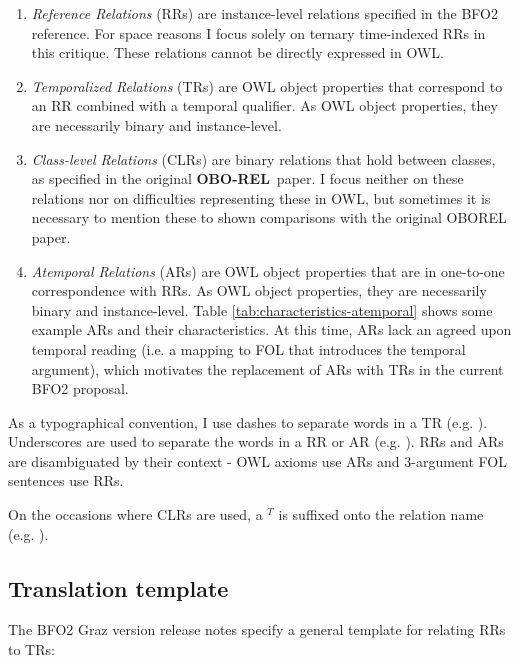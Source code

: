 \documentclass{bioinfo}
\def\partOfT{\pr{part\_of$^T$}}
\def\partOf{\pr{part\_of}}
\def\partOfAtAllTimes{\pr{part-of-at-all-times}}
\def\OBOREL{\textbf{OBO-REL}}
\begin{document}
\begin{enumerate}

\item \emph{Reference Relations} (RRs) are instance-level relations
  specified in the BFO2 reference. For space reasons I focus solely on
  ternary time-indexed RRs in this critique. These relations cannot be
  directly expressed in OWL.

\item \emph{Temporalized Relations} (TRs) are OWL object properties
  that correspond to an RR combined with a temporal qualifier. As OWL
  object properties, they are necessarily binary and instance-level.

\item \emph{Class-level Relations} (CLRs) are binary relations that
  hold between classes, as specified in the original \OBOREL\ paper. I
  focus neither on these relations nor on difficulties representing
  these in OWL, but sometimes it is necessary to mention these to
  shown comparisons with the original OBOREL paper.

\item \emph{Atemporal Relations} (ARs) are OWL object properties that
  are in one-to-one correspondence with RRs. As OWL object properties,
  they are necessarily binary and instance-level. Table
  \ref{tab:characteristics-atemporal} shows some example ARs and their
  characteristics. At this time, ARs lack an agreed upon temporal
  reading (i.e. a mapping to FOL that introduces the temporal
  argument), which motivates the replacement of ARs with TRs in the
  current BFO2 proposal.

\end{enumerate}

As a typographical convention, I use dashes to separate words in a TR
(e.g. \partOfAtAllTimes). Underscores are used to separate the words
in a RR or AR (e.g. \partOf). RRs and ARs are disambiguated by their
context - OWL axioms use ARs and 3-argument FOL sentences use RRs.

On the occasions where CLRs are used, a $^T$ is suffixed onto the
relation name (e.g. \partOfT).


\subsection{Translation template}

The BFO2 Graz version release notes\cite{Graz} specify a general
template for relating RRs to TRs:
\end{document}

